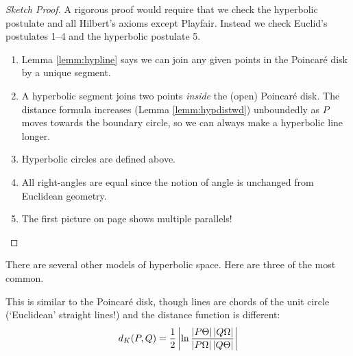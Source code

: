 \begin{proof}[Sketch Proof]
A rigorous proof would require that we check the hyperbolic postulate and all Hilbert's axioms except Playfair. Instead we check Euclid's postulates 1--4 and the hyperbolic postulate 5.
\begin{enumerate}\itemsep0pt
  \item Lemma \ref{lemm:hypline} says we can join any given points in the Poincaré disk by a unique segment.
  \item A hyperbolic segment joins two points \emph{inside} the (open) Poincaré disk. The distance formula increases (Lemma \ref{lemm:hypdistwd}) unboundedly as $P$ moves towards the boundary circle, so we can always make a hyperbolic line longer.
  \item Hyperbolic circles are defined above.
  \item All right-angles are equal since the notion of angle is unchanged from Euclidean geometry.
  \item The first picture on page \pageref{sec:hyp-models} shows multiple parallels!\hfill{\qedhere}
\end{enumerate}
\end{proof}

\goodbreak




There are several other models of hyperbolic space. Here are three of the most common.%

 This is similar to the Poincaré disk, though lines are chords of the unit circle (`Euclidean' straight lines!) and the distance function is different:
\[d_K(P,Q)=\frac 12\left| \ln\frac{\left| P\Theta\right|\left| Q\Omega\right|}{\left| P\Omega\right|\left| Q\Theta\right|}\right|\]

